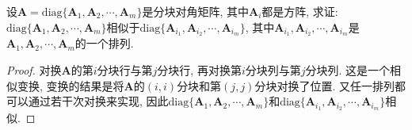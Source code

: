 \documentclass[../../main.tex]{subfiles}
\begin{document}
\begin{corollary}\label{example6.22}
设\(\boldsymbol{A}=\mathrm{diag}\{\boldsymbol{A}_{1},\boldsymbol{A}_{2},\cdots,\boldsymbol{A}_{m}\}\)是分块对角矩阵, 其中\(\boldsymbol{A}_{i}\)都是方阵, 求证: \(\mathrm{diag}\{\boldsymbol{A}_{1},\boldsymbol{A}_{2},\cdots,\boldsymbol{A}_{m}\}\)相似于\(\mathrm{diag}\{\boldsymbol{A}_{i_{1}},\boldsymbol{A}_{i_{2}},\cdots,\boldsymbol{A}_{i_{m}}\}\), 其中\(\boldsymbol{A}_{i_{1}},\boldsymbol{A}_{i_{2}},\cdots,\boldsymbol{A}_{i_{m}}\)是\(\boldsymbol{A}_{1},\boldsymbol{A}_{2},\cdots,\boldsymbol{A}_{m}\)的一个排列.
\end{corollary}
\begin{proof}
对换\(\boldsymbol{A}\)的第\(i\)分块行与第\(j\)分块行, 再对换第\(i\)分块列与第\(j\)分块列. 这是一个相似变换, 变换的结果是将\(\boldsymbol{A}\)的\((i,i)\)分块和第\((j,j)\)分块对换了位置. 又任一排列都可以通过若干次对换来实现, 因此\(\mathrm{diag}\{\boldsymbol{A}_{1},\boldsymbol{A}_{2},\cdots,\boldsymbol{A}_{m}\}\)和\(\mathrm{diag}\{\boldsymbol{A}_{i_{1}},\boldsymbol{A}_{i_{2}},\cdots,\boldsymbol{A}_{i_{m}}\}\)相似.

\end{proof}
\end{document}
